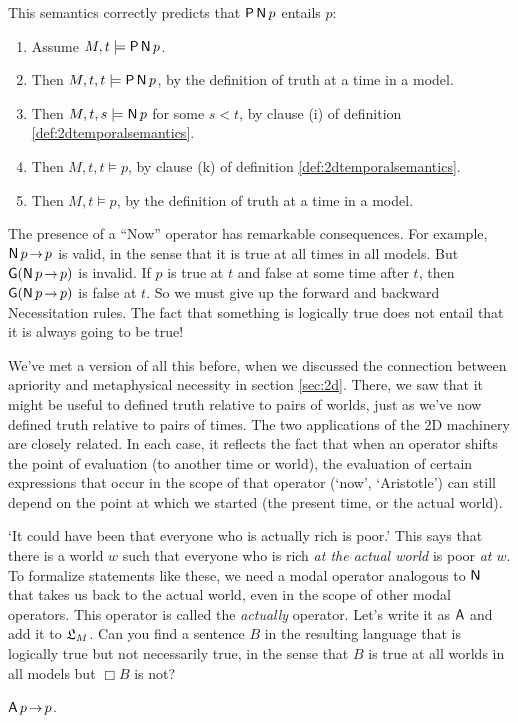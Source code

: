 This semantics correctly predicts that $\operatorname{\mathsf{P}}\operatorname{\mathsf{N}} p$ entails $p$:
\begin{enumerate}[leftmargin=10mm]
  \itemsep-1mm
\item Assume $M,t \models \tP\tN p$.
\item Then $M,t,t \models \tP\tN p$, by the definition of truth at a time in a model.
\item Then $M,t,s \models \tN p$ for some $s<t$, by clause (i) of definition \ref{def:2dtemporalsemantics}.
\item Then $M,t,t \models p$, by clause (k) of definition \ref{def:2dtemporalsemantics}.
\item Then $M,t \models p$, by the definition of truth at a time in a model.
\end{enumerate}

The presence of a ``Now'' operator has remarkable consequences. For example,
$\tN p \to p$ is valid, in the sense that it is true at all times in all models.
But $\tG(\tN p \to p)$ is invalid. If $p$ is true at $t$ and false at some time
after $t$, then $\tG(\tN p \to p)$ is false at $t$. So we must give up the
forward and backward Necessitation rules. The fact that something is logically
true does not entail that it is always going to be true!

We've met a version of all this before,
when we discussed the connection between apriority and metaphysical necessity in section \ref{sec:2d}.
There,
we saw that it might be useful to defined truth relative to pairs of worlds,
just as we've now defined truth relative to pairs of times.
The two applications of the 2D machinery are closely related.
In each case,
it reflects the fact that
when an operator shifts the point of evaluation
(to another time or world),
the evaluation of certain expressions that occur in the scope of that operator
(`now', `Aristotle')
can still depend on the point at which we started
(the present time, or the actual world).

\begin{exercise}
  `It could have been that everyone who is actually rich is poor.' This says
  that there is a world $w$ such that everyone who is rich \emph{at the actual
    world} is poor \emph{at $w$}. To formalize statements like these, we need a
  modal operator analogous to $\operatorname{\mathsf{N}}$ that takes us back to the actual world, even
  in the scope of other modal operators. This operator is called the
  \emph{actually} operator. Let's write it as $\operatorname{\mathsf{A}}$ and add it to $\mathfrak{L}_{M}$. Can
  you find a sentence $B$ in the resulting language that is logically true but not
  necessarily true, in the sense that $B$ is true at all worlds in all models
  but $\Box B$ is not?
\end{exercise}
\begin{solution}
  $\tA p \to p$.
\end{solution}

